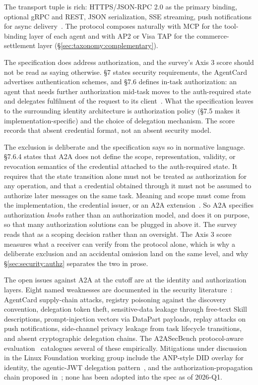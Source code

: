 The transport tuple is rich: HTTPS/JSON-RPC 2.0 as the
primary binding, optional gRPC and REST, JSON
serialization, SSE streaming, push notifications for async
delivery~\cite{spec_a2a}. The protocol composes naturally
with MCP for the tool-binding layer of each agent and with
AP2 or Visa TAP for the commerce-settlement layer
(\S\ref{sec:taxonomy:complementary}).

The specification does address authorization, and the
survey's Axis 3 score should not be read as saying
otherwise. \S7 states security requirements, the AgentCard
advertises authentication schemes, and \S7.6 defines
in-task authorization: an agent that needs further
authorization mid-task moves to the auth-required state and
delegates fulfilment of the request to its
client~\cite{spec_a2a}. What the specification leaves to
the surrounding identity architecture is authorization
policy (\S7.5 makes it implementation-specific) and the
choice of delegation mechanism. The score records that
absent credential format, not an absent security model.

The exclusion is deliberate and the specification says so
in normative language. \S7.6.4 states that A2A does not
define the scope, representation, validity, or revocation
semantics of the credential attached to the auth-required
state. It requires that the state transition alone must not
be treated as authorization for any operation, and that a
credential obtained through it must not be assumed to
authorize later messages on the same task. Meaning and scope
must come from the implementation, the credential issuer, or
an A2A extension~\cite{spec_a2a}. So A2A specifies
authorization \emph{knobs} rather than an authorization
model, and does it on purpose, so that many authorization
solutions can be plugged in above it. The survey reads that
as a scoping decision rather than an oversight. The Axis 3
score measures what a receiver can verify from the protocol
alone, which is why a deliberate exclusion and an accidental
omission land on the same level, and why
\S\ref{sec:security:authz} separates the two in prose.

The open issues against A2A at the cutoff are at the
identity and authorization layers. Eight named weaknesses
are documented in the security
literature~\cite{a2a_weaknesses}: AgentCard supply-chain
attacks, registry poisoning against the discovery convention,
delegation token theft, sensitive-data leakage through
free-text Skill descriptions, prompt-injection vectors via
DataPart payloads, replay attacks on push notifications,
side-channel privacy leakage from task lifecycle
transitions, and absent cryptographic delegation chains.
The A2ASecBench protocol-aware
evaluation~\cite{a2asecbench} catalogues several of these
empirically. Mitigations under discussion in the
Linux Foundation working group include the
ANP-style DID overlay for identity, the agentic-JWT
delegation pattern~\cite{agentic_jwt}, and the
authorization-propagation chain
proposed in~\cite{authz_propagation}; none has been
adopted into the spec as of 2026-Q1.

